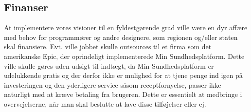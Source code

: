 \subsection{Finanser}
At implementere vores visioner til en fyldestgørende grad ville være en dyr affære med behov for programmører og andre designere, som regionen og/eller staten skal finansiere. Evt. ville jobbet skulle outsources til et firma som det amerikanske Epic, der oprindeligt implementerede Min Sundhedsplatform. Dette ville skulle gøres uden udsigt til indtægt, da Min Sundhedsplatform er udelukkende gratis og der derfor ikke er mulighed for at tjene penge ind igen på investeringen og den yderligere service såsom receptfornyelse, passer ikke naturligt med at kræve betaling fra brugeren. Dette er essentielt at medbringe i overvejelserne, når man skal beslutte at lave disse tilføjelser eller ej. 

